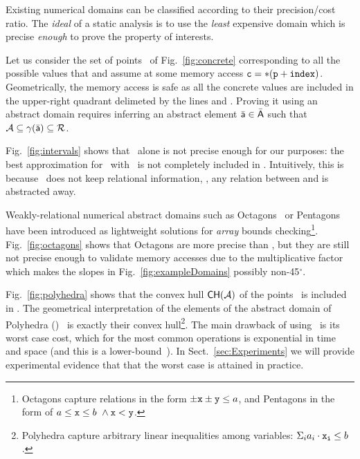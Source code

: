 \documentclass[10pt]{sigplanconf}
\begin{document}
Existing numerical domains can be classified according to their precision/cost ratio.
The \emph{ideal} of a static analysis is to use the \emph{least} expensive domain which is precise \emph{enough} to prove the property of interests.

Let us consider the set of points \points\ of Fig.~\ref{fig:concrete}
corresponding to all the possible values that  and 
assume at some memory access $\mathtt{c = *(p + index)}$.
Geometrically, the memory access is safe as all the concrete values
are included in the upper-right quadrant delimeted by the lines
 and .  Proving it using an abstract domain
 requires inferring an abstract element $\bar{\mathsf{a}} \in \bar{\mathsf{A}}$
such that $\mathcal{A} \subseteq \gamma(\bar{\mathsf{a}}) \subseteq \mathcal{R}$.

Fig.~\ref{fig:intervals} shows that \Intervals\ alone is not precise
enough for our purposes: the best approximation for \points\ with
\Intervals\ is not completely included in \plane.  Intuitively, this
is because \Intervals\ does not keep relational information, \eg, any
relation between  and  is abstracted away.

Weakly-relational numerical abstract domains such as
Octagons~\cite{Mine01-2} or Pentagons~\cite{LogozzoMaf08} have been
introduced as lightweight solutions for \emph{array} bounds
checking\footnote{Octagons capture relations in the
form $\pm \mathtt{x} \pm \mathtt{y} \leq a$, and Pentagons in the form of
$a \leq \mathtt{x} \leq b\ \wedge \mathtt{x} < \mathtt{y}$.}.
Fig.~\ref{fig:octagons} shows that Octagons are more precise than
\Intervals, but they are still not precise enough to validate memory
accesses due to the multiplicative factor  which makes
the slopes in Fig.~\ref{fig:exampleDomains} possibly non-45$^\circ$.

Fig.~\ref{fig:polyhedra} shows that the convex hull
$\mathsf{CH}(\mathcal{A})$ of the points \points\ is included in \plane.
The geometrical interpretation of the elements of the abstract domain
of Polyhedra (\Polyhedra)~\cite{CousotHalbwachs78} is exactly their
convex hull\footnote{Polyhedra capture arbitrary linear inequalities
among variables: $\Sigma_{i} a_i \cdot \mathtt{x_i} \leq b$.}.  The main
drawback of using \Polyhedra\ is its worst case cost, which for the
most common operations is exponential in time and space (and this is a
lower-bound~\cite{KhachiyanBBEG06}).  In
Sect.~\ref{sec:Experiments} we will provide experimental evidence that 
that the worst case is attained in practice.
\end{document}
